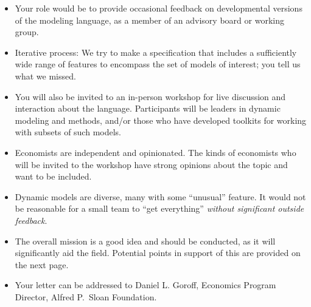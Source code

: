 \documentclass[12pt,pdftex,letterpaper]{article}
\begin{document}
\begin{itemize}
	\item Your role would be to provide occasional feedback on developmental versions of the modeling language, as a member of an advisory board or working group.
	
	\item Iterative process: We try to make a specification that includes a sufficiently wide range of features to encompass the set of models of interest; you tell us what we missed.
	
	\item You will also be invited to an in-person workshop for live discussion and interaction about the language. Participants will be leaders in dynamic modeling and methods, and/or those who have developed toolkits for working with subsets of such models.
	
	\item Economists are independent and opinionated. The kinds of economists who will be invited to the workshop have strong opinions about the topic and want to be included.
	
	\item Dynamic models are diverse, many with some ``unusual'' feature. It would not be reasonable for a small team to ``get everything'' \textit{without significant outside feedback}.
	
	\item The overall mission is a good idea and should be conducted, as it will significantly aid the field. Potential points in support of this are provided on the next page.
	
	\item Your letter can be addressed to Daniel L. Goroff, Economics Program Director,	Alfred P.\ Sloan Foundation.
	
\end{itemize}

\newpage

\vspace{0.25cm}
\end{document}
